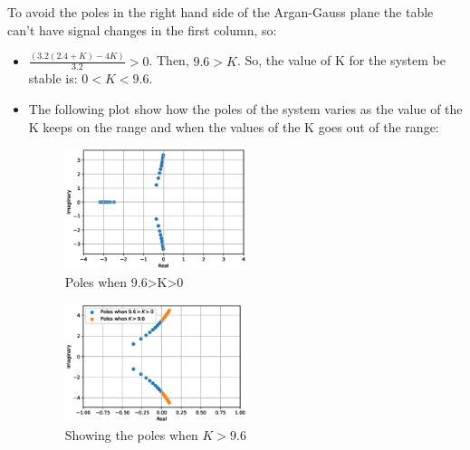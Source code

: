 \documentclass[a4paper]{article}
\begin{document}
To avoid the poles in the right hand side of the Argan-Gauss plane the table can't have signal changes in the first column, so:
\begin{itemize}
    \item $\frac{(3.2(2.4+K)-4K)}{3.2}>0$. Then, $9.6>K$. So, the value of K for the system be stable is: $0<K<9.6$.
    \item The following plot show how the poles of the system varies as the value of the K keeps on the range and when the values of the K goes out of the range:
    \vspace{-1em}
    \begin{multicols}{2}
    \begin{figure}[H]
        \centering
        \includegraphics[width=0.5\textwidth]{Figures/Question4/EXE_4_ITEM_1.eps}
        \caption{Poles when 9.6>K>0 }
        \label{fig:EXE_2_POLES_LHP}
    \end{figure}
   \columnbreak
   
    
    \begin{figure}[H]
        \centering
        \includegraphics[width=0.5\textwidth]{Figures/Question4/EXE_4_ITEM_2.eps}
        \caption{Showing the poles when $K>9.6$}
        \label{fig:EXE_2_POLES_RHP}
    \end{figure}
    \end{multicols}
\end{itemize}
\end{document}

